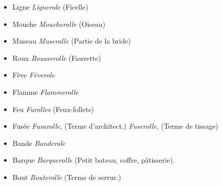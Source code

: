 \documentclass[french,twoside]{book} %
\begin{document}
\begin{itemize}[itemsep=0pt,]
\item Ligne {\itshape Lignerole} (Ficelle)
\item Mouche {\itshape Moucherolle} (Oiseau)
\item Museau {\itshape Muserolle} (Partie de la bride)
\item Roux {\itshape Rousserolle} (Fauvette)
\item Fève {\itshape Fèverole}
\item Flamme {\itshape Flammerolle}
\item Feu {\itshape Furolles} (Feux-follets)
\item Fusée {\itshape Fusarolle}, (Terme d’architect.) {\itshape Fuserolle}, (Terme de tissage)
\item Bande {\itshape Banderole}
\item Barque {\itshape Barquerolle} (Petit bateau, coffre, pâtisserie).
\item Bout {\itshape Bouterolle} (Terme de serrur.)
\end{itemize}
\end{document}
